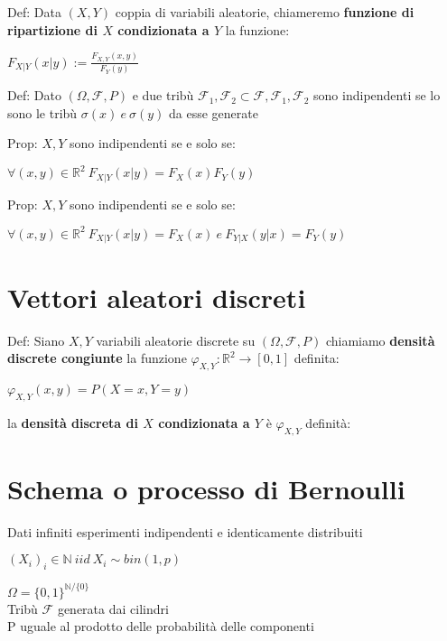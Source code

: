 \documentclass[11pt, letterpaper]{article}
\begin{document}
Def: Data $(X,Y)$ coppia di variabili aleatorie, chiameremo \textbf{funzione di ripartizione di $X$ condizionata a $Y$}
la funzione:
\begin{center}
    $F_{X|Y}(x|y):= \frac{F_{X,Y}(x,y)}{F_{Y}(y)}$
\end{center}

Def: Dato $(\Omega,\mathcal{F},P)$ e due tribù $\mathcal{F}_{1}, \mathcal{F}_{2}\subset\mathcal{F},\mathcal{F}_{1},
\mathcal{F}_{2}$ sono indipendenti se lo sono le tribù $\sigma(x)\ e\ \sigma(y)$ da esse generate 

Prop: $X,Y$ sono indipendenti se e solo se:
\begin{center}
    $\forall(x,y)\in\mathbb{R}^{2}\ F_{X|Y}(x|y)=F_{X}(x)F_{Y}(y)$    
\end{center}

Prop: $X,Y$ sono indipendenti se e solo se:
\begin{center}
    $\forall(x,y)\in\mathbb{R}^{2}\ F_{X|Y}(x|y)=F_{X}(x)\ e\ F_{Y|X}(y|x)=F_{Y}(y)$    
\end{center}

\section{Vettori aleatori discreti}

Def: Siano $X,Y$ variabili aleatorie discrete su $(\Omega,\mathcal{F},P)$ chiamiamo \textbf{densità discrete congiunte}
la funzione $\varphi_{X,Y}:\mathbb{R}^{2}\rightarrow [0,1]$ definita:
\begin{center}
        $\varphi_{X,Y}(x,y)=P(X=x, Y=y)$
\end{center}
la \textbf{densità discreta di $X$ condizionata a $Y$} è  $\varphi_{X,Y}$ definità:

\newpage
\pagestyle{fancy}
\section{Schema o processo di Bernoulli}

Dati infiniti esperimenti indipendenti e identicamente distribuiti
\begin{center}
    $(X_{i})_{i}\in\mathbb{N}\ iid\ X_{i}\sim bin(1,p)$
\end{center}
$\Omega=\{0,1\}^{\mathbb{N}/\{0\}}$\\
Tribù $\mathcal{F}$ generata dai cilindri\\
P uguale al prodotto delle probabilità delle componenti
\end{document}

